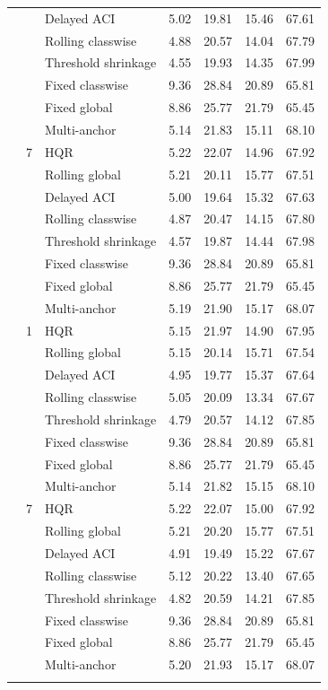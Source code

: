 \begin{table}[p]
\begin{tabular}{rrlrrrr}
 &  & Delayed ACI & 5.02 & 19.81 & 15.46 & 67.61 \\
 &  & Rolling classwise & 4.88 & 20.57 & 14.04 & 67.79 \\
 &  & Threshold shrinkage & 4.55 & 19.93 & 14.35 & 67.99 \\
 &  & Fixed classwise & 9.36 & 28.84 & 20.89 & 65.81 \\
 &  & Fixed global & 8.86 & 25.77 & 21.79 & 65.45 \\
 &  & Multi-anchor & 5.14 & 21.83 & 15.11 & 68.10 \\
\addlinespace
128 & 7 & HQR & 5.22 & 22.07 & 14.96 & 67.92 \\
 &  & Rolling global & 5.21 & 20.11 & 15.77 & 67.51 \\
 &  & Delayed ACI & 5.00 & 19.64 & 15.32 & 67.63 \\
 &  & Rolling classwise & 4.87 & 20.47 & 14.15 & 67.80 \\
 &  & Threshold shrinkage & 4.57 & 19.87 & 14.44 & 67.98 \\
 &  & Fixed classwise & 9.36 & 28.84 & 20.89 & 65.81 \\
 &  & Fixed global & 8.86 & 25.77 & 21.79 & 65.45 \\
 &  & Multi-anchor & 5.19 & 21.90 & 15.17 & 68.07 \\
\addlinespace
512 & 1 & HQR & 5.15 & 21.97 & 14.90 & 67.95 \\
 &  & Rolling global & 5.15 & 20.14 & 15.71 & 67.54 \\
 &  & Delayed ACI & 4.95 & 19.77 & 15.37 & 67.64 \\
 &  & Rolling classwise & 5.05 & 20.09 & 13.34 & 67.67 \\
 &  & Threshold shrinkage & 4.79 & 20.57 & 14.12 & 67.85 \\
 &  & Fixed classwise & 9.36 & 28.84 & 20.89 & 65.81 \\
 &  & Fixed global & 8.86 & 25.77 & 21.79 & 65.45 \\
 &  & Multi-anchor & 5.14 & 21.82 & 15.15 & 68.10 \\
\addlinespace
512 & 7 & HQR & 5.22 & 22.07 & 15.00 & 67.92 \\
 &  & Rolling global & 5.21 & 20.20 & 15.77 & 67.51 \\
 &  & Delayed ACI & 4.91 & 19.49 & 15.22 & 67.67 \\
 &  & Rolling classwise & 5.12 & 20.22 & 13.40 & 67.65 \\
 &  & Threshold shrinkage & 4.82 & 20.59 & 14.21 & 67.85 \\
 &  & Fixed classwise & 9.36 & 28.84 & 20.89 & 65.81 \\
 &  & Fixed global & 8.86 & 25.77 & 21.79 & 65.45 \\
 &  & Multi-anchor & 5.20 & 21.93 & 15.17 & 68.07 \\
\addlinespace
\bottomrule
\end{tabular}
\end{table}
